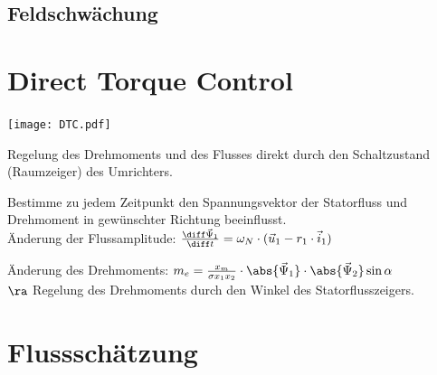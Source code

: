 \documentclass[german]{latex4ei_fs}
\begin{document}
\begin{sectionbox}
\subsection{Feldschwächung}    
\end{sectionbox}
\section{Direct Torque Control} 
\begin{sectionbox}
\texttt{[image: DTC.pdf]}


Regelung des Drehmoments und des Flusses direkt durch den Schaltzustand (Raumzeiger) des Umrichters.

Bestimme zu jedem Zeitpunkt den Spannungsvektor der Statorfluss und Drehmoment in gewünschter Richtung beeinflusst. \\


Änderung der Flussamplitude: $\frac{\diff \vec \Psi_1}{\diff t} = \omega_N \cdot (\vec u_1 - r_1 \cdot \vec i_1)$

Änderung des Drehmoments: $m_e = \frac{x_m}{\sigma x_1 x_2} \cdot \abs{\vec \Psi_1} \cdot \abs{\vec \Psi_2} \sin \alpha$ \\
$\ra $ Regelung des Drehmoments durch den Winkel des Statorflusszeigers.
\end{sectionbox}

\section{Flussschätzung} 
\end{document}
